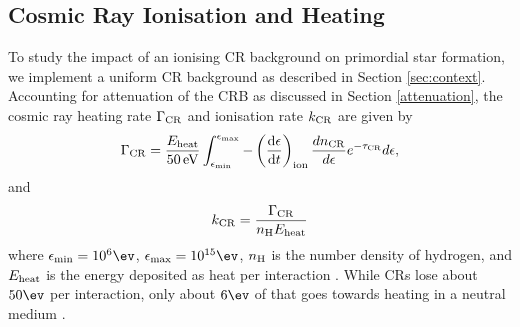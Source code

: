 \subsection{Cosmic Ray Ionisation and Heating}
\label{CRchem}
To study the impact of an ionising CR background on primordial star formation, we implement a uniform CR background as described in Section \ref{sec:context}. Accounting for attenuation of the CRB as discussed in Section \ref{attenuation}, the cosmic ray heating rate $\Gamma_{\rm \small CR}$ and ionisation rate $k_{\rm \small CR}$ are given by
\begin{equation}
\Gamma_{\rm \small CR} = 
    \frac{ E_{\rm \small heat}}{50\,{\rm \small eV}} 
    \int_{\epsilon_{\rm min}}^{\epsilon_{\rm max}} 
    - \left( \frac{{\rm d}\epsilon} {{\rm d}t} \right)_{\rm ion}
    \frac{dn_{\rm \tiny CR}}{d\epsilon} e^{-\tau_{\rm \small CR}} d\epsilon,
\end{equation}
and 
\begin{equation}
k_{\rm \small CR} = \frac{\Gamma_{\rm \small CR}}{ n_{\rm \small H} E_{\rm \small heat}}
\end{equation}
where $\epsilon_{\rm min} = 10^6\ev$, $\epsilon_{\rm max}= 10^{15}\ev$, $n_{\rm \small H}$ is the number density of hydrogen, and $E_{\rm \small heat}$ is the energy deposited as heat per interaction \citep{Schlickeiser2002}.
While CRs lose about $50\ev$ per interaction, only about $6\ev$ of that goes towards heating in a neutral medium \citep{SpitzerScott1969, ShullvanSteenberg1985}.